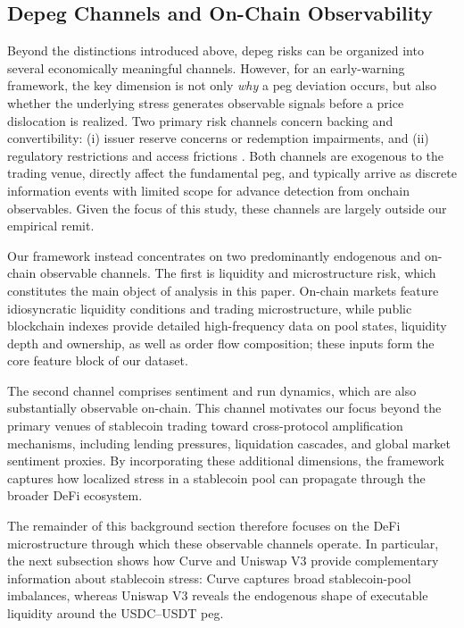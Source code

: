 \documentclass[a4paper,fleqn]{cas-sc}
\begin{document}
\subsection{Depeg Channels and On-Chain Observability}
\label{subsec:depeg_channels_observability}

Beyond the distinctions introduced above, depeg risks can be organized into several economically meaningful channels. However, for an early-warning framework, the key dimension is not only \emph{why} a peg deviation occurs, but also whether the underlying stress generates observable signals before a price dislocation is realized. Two primary risk channels concern backing and convertibility: (i) issuer reserve concerns or redemption impairments, and (ii) regulatory restrictions and access frictions \citep{eichengreen2025}. Both channels are exogenous to the trading venue, directly affect the fundamental peg, and typically arrive as discrete information events with limited scope for advance detection from onchain observables. Given the focus of this study, these channels are largely outside our empirical remit.

Our framework instead concentrates on two predominantly endogenous and on-chain observable channels. The first is liquidity and microstructure risk, which constitutes the main object of analysis in this paper. On-chain markets feature idiosyncratic liquidity conditions and trading microstructure, while public blockchain indexes provide detailed high-frequency data on pool states, liquidity depth and ownership, as well as order flow composition; these inputs form the core feature block of our dataset. 

The second channel comprises sentiment and run dynamics, which are also substantially observable on-chain. This channel motivates our focus beyond the primary venues of stablecoin trading toward cross-protocol amplification mechanisms, including lending pressures, liquidation cascades, and global market sentiment proxies. By incorporating these additional dimensions, the framework captures how localized stress in a stablecoin pool can propagate through the broader DeFi ecosystem.

The remainder of this background section therefore focuses on the DeFi microstructure through which these observable channels operate. In particular, the next subsection shows how Curve and Uniswap V3 provide complementary information about stablecoin stress: Curve captures broad stablecoin-pool imbalances, whereas Uniswap V3 reveals the endogenous shape of executable liquidity around the USDC--USDT peg.
\end{document}
